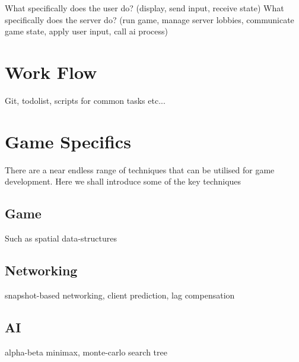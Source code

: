\documentclass{standalone}
\begin{document}
	What specifically does the user do? (display, send input, receive state)
	What specifically does the server do? (run game, manage server lobbies, communicate game state, apply user input, call ai process)

	

	\section{Work Flow}
		Git, todolist, scripts for common tasks etc...
		
	\section{Game Specifics}
		There are a near endless range of techniques that can be utilised for game development. Here we shall introduce some of the key techniques

		\subsection{Game}
			Such as spatial data-structures

		\subsection{Networking}
			snapshot-based networking, client prediction, lag compensation

		\subsection{AI}
			alpha-beta minimax, monte-carlo search tree
\end{document}
